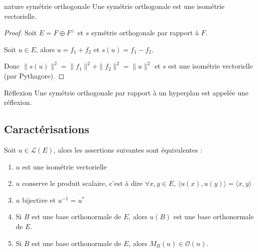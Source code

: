 \begin{proposition}{nature symétrie orthogonale}{}
    Une symétrie orthogonale est une isométrie vectorielle.
\end{proposition}


\begin{proof}
    Soit $E = F \oplus F^\perp$ et $s$ symétrie orthogonale par rapport à $F$. 

    Soit $u \in E$, alors $u = f_1 + f_2$ et $s(u) = f_1 - f_2$.

    Donc $\| s(u) \|^2 = \| f_1 \|^2 + \| f_2 \|^2 = \| u \|^2$ et $s$ est une isométrie vectorielle 
    (par Pythagore).
\end{proof}

\begin{definition}{Réflexion}{}
    Une symétrie orthogonale par rapport à un hyperplan est appelée une réflexion. 
\end{definition}

\subsection{Caractérisations}
\label{Caracterisation_isos}

\begin{theoreme}{}{}
    Soit $u \in \mathscr L(E)$, alors les assertions suivantes sont équivalentes :
    \begin{enumerate}
        \item $u$ est une isométrie vectorielle
        \item $u$ conserve le produit scalaire, c'est à dire 
        $\forall x, y \in E$, $\langle u(x), u(y) \rangle = \langle x, y \rangle$
        \item $u$ bijective et $u^{-1} = u^*$
        \item Si $B$ est une base orthonormale de $E$, alors $u(B)$ est une base orthonormale de $E$.
        \item Si $B$ est une base orthonormale de $E$, alors $M_B(u) \in \mathcal O(n)$.
    \end{enumerate}
\end{theoreme}


